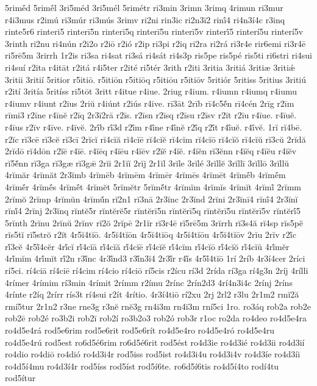 {5rimḗd
5rimḗl
3ri5méd
3ri5mél
5rimétr
ri3min
3rimn
3rimq
4rimun
ri3mur
r4i3mus
r2imú
ri3múr
ri3mús
3rimv
ri2ni
rin3ic
ri2n3ī2
rinī́4
ri4n3í4c
r3inq
rinte5r6
rinteri5
rinterī5n
rinterī5q
rinterī5u
rinterī5v
rinterī́5
rinterí5u
rinterí5v
3rinth
ri2nu
ri4nún
r2i2o
r2iō
r2ió
r2ip
ri3pi
r2iq
ri2ra
ri2rá
ri3r4e
rir6emi
ri3r4ē
ri5rē5m
3rirrh
1r2is
ri3sa
ri4sat
ri3sá
ri4sát
ri4s3p
ris5pe
ris5pé
ris5ti
ri6stri
ri4sui
ri4suí
r2ita
r4itāt
r2itá
r4i5ter
r2ité
ri5tér
3rith
r2iti
3ritia
3ritiá
3ritiæ
3ritiǽ
3ritii
3ritií
5ritior
r5itiō.
r5itiōn
r5itiōq
r5itiōu
r5itiōv
5ritiór
5ritiss
5ritius
3ritiú
r2ití
3ritía
5ritíss
ri5tōt
3ritt
r4itue
r4iue.
2riug
r4ium.
r4iumn
r4iumq
r4iumu
r4iumv
r4iunt
r2ius
2riŭ
r4iúnt
r2iús
r4ive.
rī3āt
2rīb
rī4c5ĕ́n
rī4cén
2rīg
r2īm
rīmi3
r2īne
r4īnĕ
r2īq
2r3ī2rā
r2īs.
r2īsn
r2īsq
r2īsu
r2īsv
r2īt
r2īu
r4īue.
r4īuĕ.
r4īus
r2īv
r4īve.
r4īvĕ.
2rī́b
rī́3d
r2ī́m
r4ī́ne
r4ī́nĕ
r2ī́q
r2ī́t
r4ī́uĕ.
r4ī́vĕ.
1rĭ
rĭ4bē.
r2ĭc
rĭ3cē
rĭ3cĕ
rĭ3cī
2rĭcĭ
rĭ4cĭă
rĭ4cĭē
rĭ4cĭĕ
rĭ4cĭm
rĭ4cĭō
rĭ4cĭŏ
rĭ4cĭŭ
rĭ3cŭ
2rĭdă
2rĭdō
rĭ4dōn
r2ĭē
r4ĭē.
r4ĭēq
r4ĭēu
r4ĭēv
r2ĭĕ
r4ĭĕ.
r4ĭĕn
rĭ3ĕnn
r4ĭĕq
r4ĭĕu
r4ĭĕv
rĭ5ĕ́nn
rĭ3ga
rĭ3gæ
rĭ3gǣ
2rĭi
2r1ĭĭ
2rĭj
2r1ĭl
3rĭle
3rĭlé
3rĭllĕ
3rĭllī
3rĭllō
3rĭllŭ
4rĭmăr
4rĭmăt
2r3ĭmb
4rĭmēb
4rĭmēm
4rĭmēr
4rĭmēs
4rĭmēt
4rĭmḗb
4rĭmḗm
4rĭmḗr
4rĭmḗs
4rĭmḗt
4rĭmĕt
5rĭmĕtr
5rĭmĕ́tr
4rĭmĭm
4rĭmĭs
4rĭmĭt
4rĭmĭ́
2rĭmm
2rĭmŏ
2rĭmp
4rĭmŭn
4rĭmŭ́n
rĭ2n1
rĭ3nā
2r3ĭnc
2r3ĭnd
2rĭni
2r3ĭnī4
rĭnī́4
2r3ĭnĭ
rĭnĭ́4
2rĭnj
2r3ĭnq
rĭntĕ5r
rĭntĕrĕ5r
rĭntĕrī5n
rĭntĕrī5q
rĭntĕrī5u
rĭntĕrī5v
rĭntĕrī́5
5rĭnth
2rĭnu
2rĭnŭ
2rĭnv
rĭ2ŏ
2rĭpē
2r1ĭr
rĭ3r4ē
rĭ5rē5m
3rĭrrh
rĭ3s4ă
rĭ4sp
rĭs5pĕ
rĭs5tĭ
rĭ5strŏ
r2ĭt
4r5ĭ4tĭō.
4r5ĭ4tĭōn
4r5ĭ4tĭōq
4r5ĭ4tĭōu
4r5ĭ4tĭōv
2rĭu
2rĭv
r2ĭ́c
rĭ́3cĕ
4r5ĭ́4cĕr
4rĭ́cĭ
rĭ́4cĭā
rĭ́4cĭă
rĭ́4cĭē
rĭ́4cĭĕ
rĭ́4cĭm
rĭ́4cĭō
rĭ́4cĭŏ
rĭ́4cĭŭ
4rĭ́mĕr
4rĭ́mĭm
4rĭ́mĭt
rĭ́2n
r3ĭ́nc
4r3ĭ́nd3
r3ĭ́n3ĭ4
2r3ĭ́r
r4ĭ́s
4r5ĭ́4tĭō
1rí
2ríb
4r3í4cer
2ríci
rí5ci.
rí4ciā
rí4ciē
rí4cim
rí4cio
rí4ciō
rí5cis
r2ícu
rí3d
2rída
rí3ga
rí4g3n
2ríj
4rílli
4rímer
4rímim
rí3min
4rímit
2rímm
r2ímu
2rínc
2rín2d3
4rí4n3i4c
2rínj
2ríns
4rínte
r2íq
2rírr
rís3t
rí4sui
r2ít
4rítio.
4r3í4tiō
rí2xu
2rj
2rl2
r3lu
2r1m2
rmĭ2ă
rmí5tur
2r1n2
r3ne
rne3g
r3nĕ
rnĕ3g
rn4i3m
rn4ĭ3m
rní5ci
1ro.
ro3áq
rob2a
rob2e
rob2ē
rob2é
ro3b2i
rob2ī
rob2í
ro3b2o3
rob2ó
rob3r
r1oc
ro2da
ro4deo
ro4d5e4ra
ro4d5e4rá
rod5e6rim
rod5e6rit
rod5e6rít
ro4d5e4ro
ro4d5e4ró
ro4d5e4ru
ro4d5e4rú
rod5est
ro6d5é6rim
ro6d5é6rit
rod5ést
ro4d3ie
ro4d3ié
ro4d3ii
ro4d3ií
ro4dio
ro4diō
ro4dió
ro4d3i4r
rod5iss
rod5ist
ro4d3i4u
ro4d3i4v
ro4d3íe
ro4d3íi
ro4d5í4mu
ro4d3í4r
rod5íss
rod5íst
rod5í6te.
ro6d5í6tis
ro4d5í4to
rodí4tu
rod5ítur
}

